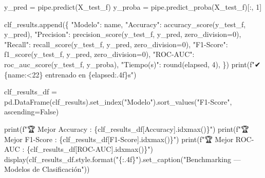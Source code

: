 \documentclass[
  letterpaper,
  DIV=11,
  numbers=noendperiod]{scrartcl}
\newenvironment{Shaded}{\begin{snugshade}}{\end{snugshade}}
\newcommand{\BuiltInTok}[1]{\textcolor[rgb]{0.00,0.23,0.31}{#1}}
\newcommand{\DecValTok}[1]{\textcolor[rgb]{0.68,0.00,0.00}{#1}}
\newcommand{\NormalTok}[1]{\textcolor[rgb]{0.00,0.23,0.31}{#1}}
\newcommand{\OperatorTok}[1]{\textcolor[rgb]{0.37,0.37,0.37}{#1}}
\newcommand{\SpecialCharTok}[1]{\textcolor[rgb]{0.37,0.37,0.37}{#1}}
\newcommand{\SpecialStringTok}[1]{\textcolor[rgb]{0.13,0.47,0.30}{#1}}
\newcommand{\StringTok}[1]{\textcolor[rgb]{0.13,0.47,0.30}{#1}}
\newcommand{\VariableTok}[1]{\textcolor[rgb]{0.07,0.07,0.07}{#1}}
\begin{document}
\begin{Shaded}
\begin{Highlighting}[]
\NormalTok{    y\_pred  }\OperatorTok{=}\NormalTok{ pipe.predict(X\_test\_f)}
\NormalTok{    y\_proba }\OperatorTok{=}\NormalTok{ pipe.predict\_proba(X\_test\_f)[:, }\DecValTok{1}\NormalTok{]}

\NormalTok{    clf\_results.append(\{}
        \StringTok{"Modelo"}\NormalTok{:    name,}
        \StringTok{"Accuracy"}\NormalTok{:  accuracy\_score(y\_test\_f, y\_pred),}
        \StringTok{"Precision"}\NormalTok{: precision\_score(y\_test\_f, y\_pred, zero\_division}\OperatorTok{=}\DecValTok{0}\NormalTok{),}
        \StringTok{"Recall"}\NormalTok{:    recall\_score(y\_test\_f, y\_pred, zero\_division}\OperatorTok{=}\DecValTok{0}\NormalTok{),}
        \StringTok{"F1{-}Score"}\NormalTok{:  f1\_score(y\_test\_f, y\_pred, zero\_division}\OperatorTok{=}\DecValTok{0}\NormalTok{),}
        \StringTok{"ROC{-}AUC"}\NormalTok{:   roc\_auc\_score(y\_test\_f, y\_proba),}
        \StringTok{"Tiempo(s)"}\NormalTok{: }\BuiltInTok{round}\NormalTok{(elapsed, }\DecValTok{4}\NormalTok{),}
\NormalTok{    \})}
    \BuiltInTok{print}\NormalTok{(}\SpecialStringTok{f"✔ }\SpecialCharTok{\{}\NormalTok{name}\SpecialCharTok{:\textless{}22\}}\SpecialStringTok{ entrenado en }\SpecialCharTok{\{}\NormalTok{elapsed}\SpecialCharTok{:.4f\}}\SpecialStringTok{s"}\NormalTok{)}

\NormalTok{clf\_results\_df }\OperatorTok{=}\NormalTok{ pd.DataFrame(clf\_results).set\_index(}\StringTok{"Modelo"}\NormalTok{).sort\_values(}\StringTok{"F1{-}Score"}\NormalTok{, ascending}\OperatorTok{=}\VariableTok{False}\NormalTok{)}

\BuiltInTok{print}\NormalTok{(}\SpecialStringTok{f"🏆 Mejor Accuracy : }\SpecialCharTok{\{}\NormalTok{clf\_results\_df[}\StringTok{\textquotesingle{}Accuracy\textquotesingle{}}\NormalTok{]}\SpecialCharTok{.}\NormalTok{idxmax()}\SpecialCharTok{\}}\SpecialStringTok{"}\NormalTok{)}
\BuiltInTok{print}\NormalTok{(}\SpecialStringTok{f"🏆 Mejor F1{-}Score : }\SpecialCharTok{\{}\NormalTok{clf\_results\_df[}\StringTok{\textquotesingle{}F1{-}Score\textquotesingle{}}\NormalTok{]}\SpecialCharTok{.}\NormalTok{idxmax()}\SpecialCharTok{\}}\SpecialStringTok{"}\NormalTok{)}
\BuiltInTok{print}\NormalTok{(}\SpecialStringTok{f"🏆 Mejor ROC{-}AUC  : }\SpecialCharTok{\{}\NormalTok{clf\_results\_df[}\StringTok{\textquotesingle{}ROC{-}AUC\textquotesingle{}}\NormalTok{]}\SpecialCharTok{.}\NormalTok{idxmax()}\SpecialCharTok{\}}\SpecialStringTok{"}\NormalTok{)}
\NormalTok{display(clf\_results\_df.style.}\BuiltInTok{format}\NormalTok{(}\StringTok{"}\SpecialCharTok{\{:.4f\}}\StringTok{"}\NormalTok{).set\_caption(}\StringTok{"Benchmarking — Modelos de Clasificación"}\NormalTok{))}
\end{Highlighting}
\end{Shaded}
\end{document}
